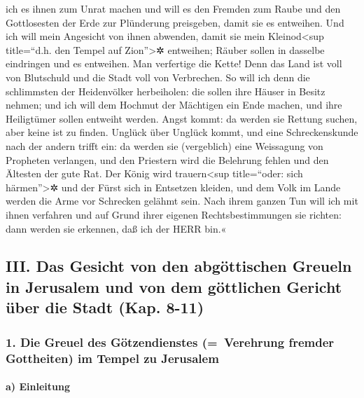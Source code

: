 ich es ihnen zum Unrat machen und will es den Fremden zum
Raube und den Gottlosesten der Erde zur Plünderung preisgeben, damit sie
es entweihen. Und ich will mein Angesicht von ihnen
abwenden, damit sie mein Kleinod\textless sup title=``d.h. den Tempel
auf Zion''\textgreater✲ entweihen; Räuber sollen in dasselbe eindringen
und es entweihen. Man verfertige die Kette! Denn das Land
ist voll von Blutschuld und die Stadt voll von Verbrechen.
So will ich denn die schlimmsten der Heidenvölker
herbeiholen: die sollen ihre Häuser in Besitz nehmen; und ich will dem
Hochmut der Mächtigen ein Ende machen, und ihre Heiligtümer sollen
entweiht werden. Angst kommt: da werden sie Rettung
suchen, aber keine ist zu finden. Unglück über Unglück
kommt, und eine Schreckenskunde nach der andern trifft ein: da werden
sie (vergeblich) eine Weissagung von Propheten verlangen, und den
Priestern wird die Belehrung fehlen und den Ältesten der gute Rat.
Der König wird trauern\textless sup title=``oder: sich
härmen''\textgreater✲ und der Fürst sich in Entsetzen kleiden, und dem
Volk im Lande werden die Arme vor Schrecken gelähmt sein. Nach ihrem
ganzen Tun will ich mit ihnen verfahren und auf Grund ihrer eigenen
Rechtsbestimmungen sie richten: dann werden sie erkennen, daß ich der
HERR bin.«

\hypertarget{iii.-das-gesicht-von-den-abguxf6ttischen-greueln-in-jerusalem-und-von-dem-guxf6ttlichen-gericht-uxfcber-die-stadt-kap.-8-11}{%
\subsection{III. Das Gesicht von den abgöttischen Greueln in Jerusalem
und von dem göttlichen Gericht über die Stadt (Kap.
8-11)}\label{iii.-das-gesicht-von-den-abguxf6ttischen-greueln-in-jerusalem-und-von-dem-guxf6ttlichen-gericht-uxfcber-die-stadt-kap.-8-11}}

\hypertarget{die-greuel-des-guxf6tzendienstes-verehrung-fremder-gottheiten-im-tempel-zu-jerusalem}{%
\subsubsection{1. Die Greuel des Götzendienstes (=~Verehrung fremder
Gottheiten) im Tempel zu
Jerusalem}\label{die-greuel-des-guxf6tzendienstes-verehrung-fremder-gottheiten-im-tempel-zu-jerusalem}}

\hypertarget{a-einleitung}{%
\paragraph{a) Einleitung}\label{a-einleitung}}

